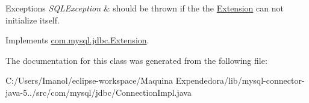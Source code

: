 \begin{DoxyExceptions}{Exceptions}
{\em S\+Q\+L\+Exception} & should be thrown if the the \mbox{\hyperlink{interfacecom_1_1mysql_1_1jdbc_1_1_extension}{Extension}} can not initialize itself. \\
\hline
\end{DoxyExceptions}


Implements \mbox{\hyperlink{interfacecom_1_1mysql_1_1jdbc_1_1_extension_a79427811058193260bd4df0c38414e88}{com.\+mysql.\+jdbc.\+Extension}}.



The documentation for this class was generated from the following file\+:\begin{DoxyCompactItemize}
\item 
C\+:/\+Users/\+Imanol/eclipse-\/workspace/\+Maquina Expendedora/lib/mysql-\/connector-\/java-\/5../src/com/mysql/jdbc/Connection\+Impl.\+java\end{DoxyCompactItemize}
